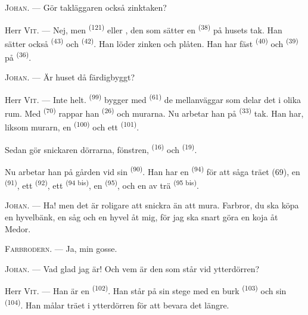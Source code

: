 \textsc{Johan}. --- Gör takläggaren också zinktaken?

Herr \textsc{Vit}. --- Nej, men  \textsuperscript{(121)} eller
, den som sätter en  \textsuperscript{(38)} på husets
tak. Han sätter också  \textsuperscript{(43)} och 
\textsuperscript{(42)}. Han löder zinken och plåten. Han har fäst 
\textsuperscript{(40)} och  \textsuperscript{(39)} på
 \textsuperscript{(36)}.

\textsc{Johan}. --- Är huset då färdigbyggt?

\VUsaut{3.0mm}
\VUsaut{3.0mm}

Herr \textsc{Vit}. --- Inte helt.  \textsuperscript{(99)} bygger med
 \textsuperscript{(61)} de mellanväggar som delar det i olika rum. Med
 \textsuperscript{(70)} rappar han
 \textsuperscript{(26)} och murarna. Nu arbetar han på
 \textsuperscript{(33)} tak. Han har, liksom murarn, en
 \textsuperscript{(100)} och ett 
\textsuperscript{(101)}.

Sedan gör snickaren dörrarna, fönstren,  \textsuperscript{(16)} och
 \textsuperscript{(19)}.

Nu arbetar han på gården vid sin  \textsuperscript{(90)}. Han har en
 \textsuperscript{(94)} för att såga träet (69), en
 \textsuperscript{(91)}, ett 
\textsuperscript{(92)}, ett  \textsuperscript{(94 bis)}, en
 \textsuperscript{(95)}, och en  av trä
\textsuperscript{(95 bis)}.

\textsc{Johan}. --- Ha! men det är roligare att snickra än att mura. Farbror, du ska köpa en
hyvelbänk, en såg och en hyvel åt mig, för jag ska snart göra en koja åt Medor.

\textsc{Farbrodern}. --- Ja, min gosse.

\textsc{Johan}. --- Vad glad jag är! Och vem är den som står vid ytterdörren?

\VUsaut{3.0mm}
\VUsaut{3.0mm}

Herr \textsc{Vit}. --- Han är en  \textsuperscript{(102)}. Han står på sin
stege med en burk  \textsuperscript{(103)} och sin
 \textsuperscript{(104)}. Han målar träet i ytterdörren för att
bevara det längre.

